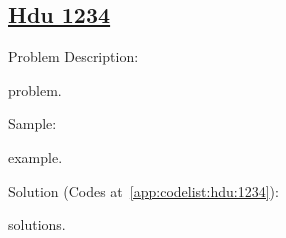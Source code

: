\subsection{\href{https://www.weblink.com}{Hdu 1234}}\label{app:problemlist:hdu:1234}

Problem Description:\par

problem.\par



Sample:\par

example.\par



Solution (Codes at~\ref{app:codelist:hdu:1234}):\par

solutions.\par



